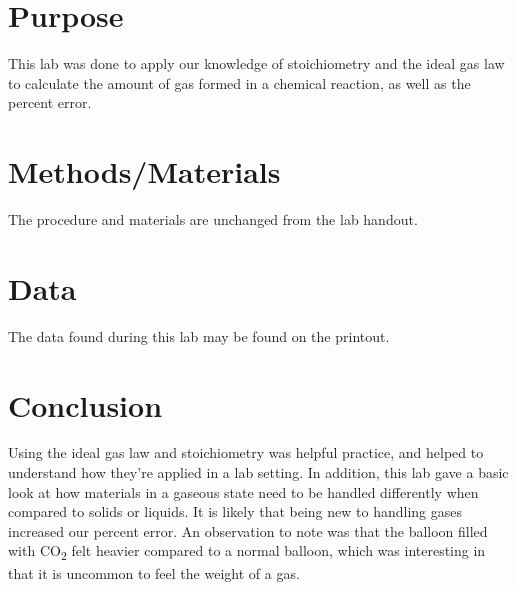 \documentclass{article}
\begin{document}

\section{Purpose}

	This lab was done to apply our knowledge of stoichiometry and the ideal gas law to calculate the amount of gas formed in a chemical reaction, as well as the percent error.

\section{Methods/Materials}

	The procedure and materials are unchanged from the lab handout.

\section{Data}

	The data found during this lab may be found on the printout.

\section{Conclusion}

	Using the ideal gas law and stoichiometry was helpful practice, and helped to understand how they're applied in a lab setting. In addition, this lab gave a basic look at how materials in a gaseous state need to be handled differently when compared to solids or liquids. It is likely that being new to handling gases increased our percent error. An observation to note was that the balloon filled with CO\textsubscript{2} felt heavier compared to a normal balloon, which was interesting in that it is uncommon to feel the weight of a gas.
\end{document}
